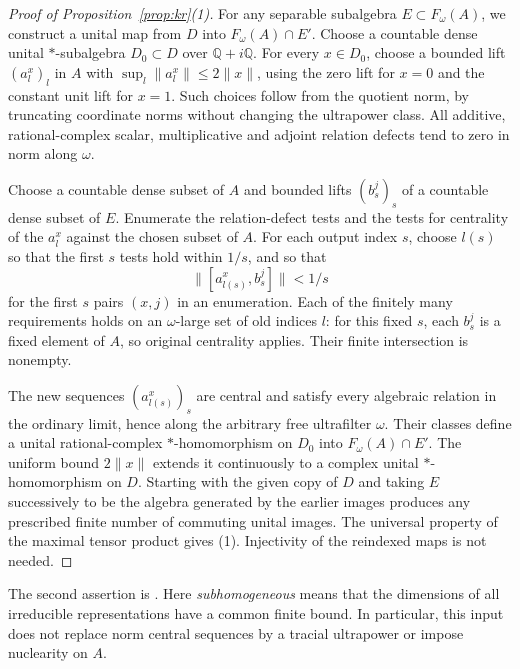 \begin{proof}[Proof of Proposition~\ref{prop:kr}(1)]
For any separable subalgebra $E\subset F_\omega(A)$, we construct a
unital map from $D$ into $F_\omega(A)\cap E'$. Choose a countable dense
unital $*$-subalgebra $D_0\subset D$ over $\mathbb Q+i\mathbb Q$.
For every $x\in D_0$, choose a bounded lift $(a_l^x)_l$ in $A$ with
$\sup_l\|a_l^x\|\le2\|x\|$, using the zero lift for $x=0$ and the
constant unit lift for $x=1$. Such choices follow from the quotient norm,
by truncating coordinate norms without changing the ultrapower class.
All additive, rational-complex scalar, multiplicative and adjoint
relation defects tend to zero in norm along $\omega$.

Choose a countable dense subset of $A$ and bounded lifts $(b_s^j)_s$
of a countable dense subset of $E$. Enumerate the relation-defect tests
and the tests for centrality of the $a_l^x$ against the chosen subset
of $A$. For each output index $s$, choose $l(s)$ so that the first $s$
tests hold within $1/s$, and so that
\[
 \|[a_{l(s)}^x,b_s^j]\|<1/s
\]
for the first $s$ pairs $(x,j)$ in an enumeration. Each of the finitely
many requirements holds on an $\omega$-large set of old indices $l$:
for this fixed $s$, each $b_s^j$ is a fixed element of $A$, so original
centrality applies. Their finite intersection is nonempty.

The new sequences $(a_{l(s)}^x)_s$ are central and satisfy every
algebraic relation in the ordinary limit, hence along the arbitrary
free ultrafilter $\omega$. Their classes define a unital
rational-complex $*$-homomorphism on $D_0$ into $F_\omega(A)\cap E'$.
The uniform bound $2\|x\|$ extends it continuously to a complex unital
$*$-homomorphism on $D$. Starting with the given copy of $D$ and taking
$E$ successively to be the algebra generated by the earlier images
produces any prescribed finite number of commuting unital images.
The universal property of the maximal tensor product gives (1).
Injectivity of the reindexed maps is not needed.
\end{proof}

The second assertion is \cite[Theorem~2.5]{KR}. Here
\emph{subhomogeneous} means that the dimensions of all irreducible
representations have a common finite bound. In particular, this input
does not replace norm central sequences by a tracial ultrapower or
impose nuclearity on $A$.
